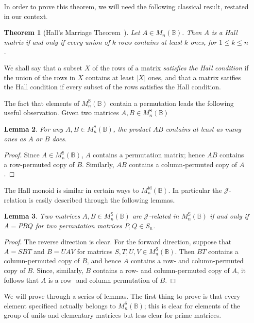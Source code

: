 \documentclass[11pt]{article}
\newtheorem{thm}{Theorem}[section]
\newtheorem{lemma}[thm]{Lemma}
\numberwithin{equation}{section}
\newcommand{\B}{\mathbb{B}}
\newcommand{\Bn}{M_n(\B)}
\newcommand{\Refn}{M_n^{\text{id}}(\B)}
\newcommand{\Halln}{M_n^{\text{S}}(\B)}
\newcommand{\J}{\mathscr{J}}
\begin{document}
In order to prove this theorem, we will need the following classical result,
restated in our context.

\begin{thm}[Hall's Marriage Theorem~{\cite[Theorem 1]{Hall1935aa}}]
  Let $A \in \Bn$. Then $A$ is a Hall matrix if and only if every union of $k$
  rows contains at least $k$ ones, for $1 \leq k \leq n$.
\end{thm}
We shall say that a subset $X$ of the rows of a matrix \emph{satisfies the Hall
  condition} if the union of the rows in $X$ contains at least $|X|$ ones, and
that a matrix satifies the Hall condition if every subset of the rows satisfies
the Hall condition.

The fact that elements of $\Halln$ contain a permutation leads the following
useful observation. Given two matrices $A, B \in \Halln$
\begin{lemma}
  For any $A, B \in \Halln$, the product $AB$ contains at least as many ones as
  $A$ or $B$ does.
\end{lemma}
\begin{proof}
  Since $A \in \Halln$, $A$ contains a permutation matrix; hence $AB$ contains a
  row-permuted copy of $B$. Similarly, $AB$ contains a column-permuted copy of
  $A$.
\end{proof}

The Hall monoid is similar in certain ways to $\Refn$. In particular the
$\J$-relation is easily described through the following lemmas.
\begin{lemma}
  Two matrices $A, B \in \Halln$ are $\J$-related in $\Halln$ if and only if $A
  = PBQ$ for two permutation matrices $P, Q \in S_n$.
\end{lemma}
\begin{proof}
  The reverse direction is clear. For the forward direction, suppose that $A =
  SBT$ and $B = UAV$ for matrices $S, T, U, V \in \Halln$. Then $BT$ contains a
  column-permuted copy of $B$, and hence $A$ contains a row- and column-permuted
  copy of $B$. Since, similarly, $B$ contains a row- and column-permuted copy of
  $A$, it follows that $A$ is a row- and column-permutation of $B$.
\end{proof}


We will prove  through a series of lemmas. The
first thing to prove is that every element specificed actually belongs to
$\Halln$; this is clear for elements of the group of units and elementary
matrices but less clear for prime matrices.
\end{document}
